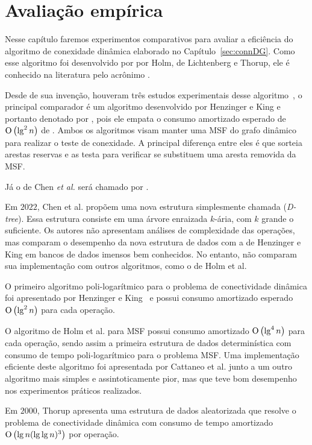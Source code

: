 \chapter{Avaliação empírica}

Nesse capítulo faremos experimentos comparativos para avaliar a eficiência do algoritmo de conexidade dinâmica elaborado no Capítulo~\ref{sec:connDG}. Como esse algoritmo foi desenvolvido por por Holm, de Lichtenberg e Thorup, ele é conhecido na literatura pelo acrônimo \HDT.

Desde de sua invenção, houveram três estudos experimentais desse algoritmo~\cite{EmpiricalStudy1997, EmpiricalStudy2002, Zaroliagis2002}, o principal comparador é um algoritmo desenvolvido por Henzinger e King e portanto denotado por \HK, pois ele empata o consumo amortizado esperado de $\text{O}\left(\lg^2 n\right)$ de \HDT. Ambos os algoritmos visam manter uma MSF do grafo dinâmico para realizar o teste de conexidade. A principal diferença entre eles é que \HK{} sorteia arestas reservas e as testa para verificar se substituem uma aresta removida da MSF.


Já o de Chen \textit{et al.} será chamado por \CLHB.

Em $2022$, Chen et al. \cite{QC22} propõem uma nova estrutura simplesmente chamada  (\textit{D-tree}). Essa estrutura consiste em uma árvore enraizada $k$-ária, com $k$ grande o suficiente. Os autores não apresentam análises de complexidade das operações, mas comparam o desempenho da nova estrutura de dados com a de Henzinger e King em bancos de dados imensos bem conhecidos. No entanto, não comparam sua implementação com outros algoritmos, como o de Holm et al.



O primeiro algoritmo poli-logarítmico para o problema de conectividade dinâmica foi apresentado por Henzinger e King~\cite{HenzingerKing} e possui consumo amortizado esperado $\text{O}\left(\lg^2 n\right)$ para cada operação. 



O algoritmo de Holm et al. para MSF possui consumo amortizado $\text{O}\left(\lg^4 n\right)$ para cada operação, sendo assim a primeira estrutura de dados determinística com consumo de tempo poli-logarítmico para o problema MSF. Uma implementação eficiente deste algoritmo foi apresentada por Cattaneo et al. \cite{xpstudy2002} junto a um outro algoritmo mais simples e assintoticamente pior, mas que teve bom desempenho nos experimentos práticos realizados.

Em $2000$, Thorup \cite{Thorup2000} apresenta uma estrutura de dados aleatorizada que resolve o problema de conectividade dinâmica com consumo de tempo amortizado $\text{O}\left(\lg n(\lg\lg n)^3\right)$ por operação.






